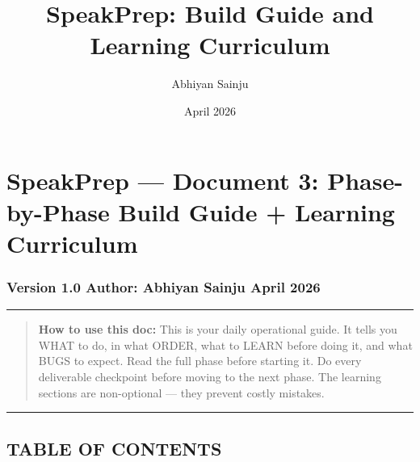 \documentclass[
  11pt,
]{article}
\title{SpeakPrep: Build Guide and Learning Curriculum}
\author{Abhiyan Sainju}
\date{April 2026}
\begin{document}
\maketitle

\hypertarget{speakprep-document-3-phase-by-phase-build-guide-learning-curriculum}{%
\section{SpeakPrep --- Document 3: Phase-by-Phase Build Guide + Learning
Curriculum}\label{speakprep-document-3-phase-by-phase-build-guide-learning-curriculum}}

\hypertarget{version-1.0-author-abhiyan-sainju-april-2026}{%
\subsubsection{Version 1.0 \textbar{} Author: Abhiyan Sainju \textbar{}
April 2026}\label{version-1.0-author-abhiyan-sainju-april-2026}}

\begin{center}\rule{0.5\linewidth}{0.5pt}\end{center}

\begin{quote}
\textbf{How to use this doc:} This is your daily operational guide. It
tells you WHAT to do, in what ORDER, what to LEARN before doing it, and
what BUGS to expect. Read the full phase before starting it. Do every
deliverable checkpoint before moving to the next phase. The learning
sections are non-optional --- they prevent costly mistakes.
\end{quote}

\begin{center}\rule{0.5\linewidth}{0.5pt}\end{center}

\hypertarget{table-of-contents}{%
\subsection{TABLE OF CONTENTS}\label{table-of-contents}}
\end{document}

